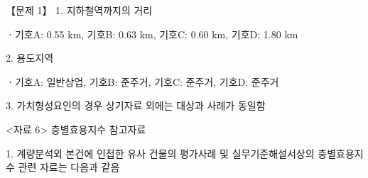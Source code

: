 \begin{longquestion}{【문제 1】}
1. 지하철역까지의 거리 \par
ㆍ기호A: 0.55 km, 기호B: 0.63 km, 기호C: 0.60 km, 기호D: 1.80 km \par
2. 용도지역 \par
ㆍ기호A: 일반상업, 기호B: 준주거, 기호C: 준주거, 기호D: 준주거 \par
3. 가치형성요인의 경우 상기자료 외에는 대상과 사례가 동일함 \par
<자료 6> 층별효용지수 참고자료 \par
1. 계량분석외 본건에 인접한 유사 건물의 평가사례 및 실무기준해설서상의 층별효용지수 관련 자료는 다음과 같음 \par
{\small\centering
{}\par}


\end{longquestion}
